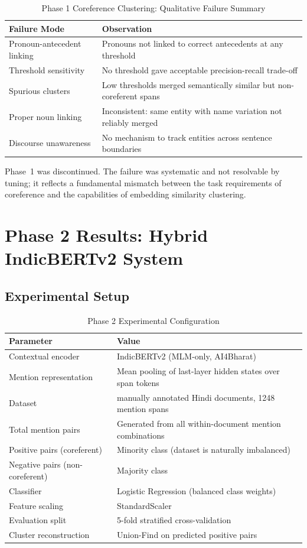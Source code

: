 \documentclass[12pt,a4paper]{report}
\begin{document}
\begin{table}[H]
\centering
\caption{Phase 1 Coreference Clustering: Qualitative Failure Summary}
\begin{tabular}{|l|l|}
\hline
\textbf{Failure Mode} & \textbf{Observation} \\
\hline
Pronoun-antecedent linking & Pronouns not linked to correct antecedents at any threshold \\
Threshold sensitivity & No threshold gave acceptable precision-recall trade-off \\
Spurious clusters & Low thresholds merged semantically similar but non-coreferent spans \\
Proper noun linking & Inconsistent: same entity with name variation not reliably merged \\
Discourse unawareness & No mechanism to track entities across sentence boundaries \\
\hline
\end{tabular}
\end{table}

\noindent Phase~1 was discontinued. The failure was systematic and not resolvable by tuning; it reflects a fundamental mismatch between the task requirements of coreference and the capabilities of embedding similarity clustering.

\section{Phase 2 Results: Hybrid IndicBERTv2 System}

\subsection{Experimental Setup}

\begin{table}[H]
\centering
\caption{Phase 2 Experimental Configuration}
\begin{tabular}{|l|l|}
\hline
\textbf{Parameter} & \textbf{Value} \\
\hline
Contextual encoder & IndicBERTv2 (MLM-only, AI4Bharat) \\
Mention representation & Mean pooling of last-layer hidden states over span tokens \\
Dataset & manually annotated Hindi documents, 1248 mention spans \\
Total mention pairs & Generated from all within-document mention combinations \\
Positive pairs (coreferent) & Minority class (dataset is naturally imbalanced) \\
Negative pairs (non-coreferent) & Majority class \\
Classifier & Logistic Regression (balanced class weights) \\
Feature scaling & StandardScaler \\
Evaluation split & 5-fold stratified cross-validation \\
Cluster reconstruction & Union-Find on predicted positive pairs \\
\hline
\end{tabular}
\end{table}
\end{document}
